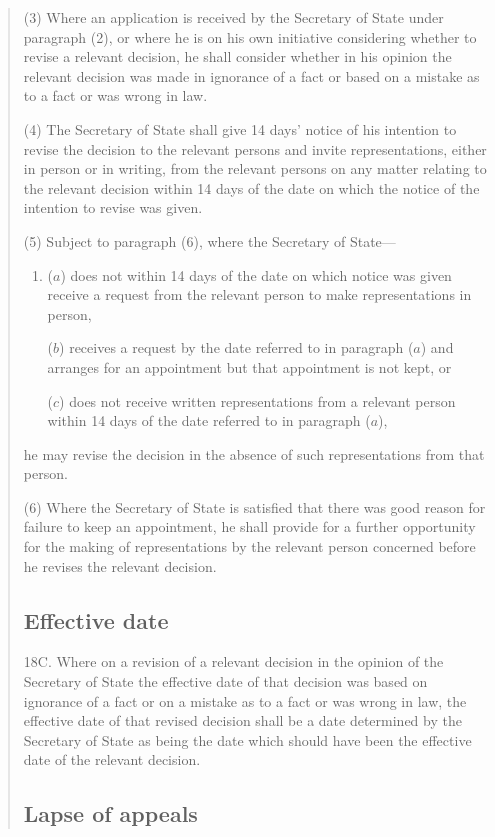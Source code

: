 \documentclass[12pt,a4paper]{article}
\begin{document}
\begin{quotation}
(3) Where an application is received by the Secretary of State under paragraph (2), or where he is on his own initiative considering whether to revise a relevant decision, he shall consider whether in his opinion the relevant decision was made in ignorance of a fact or based on a mistake as to a fact or was wrong in law.

(4) The Secretary of State shall give 14 days' notice of his intention to revise the decision to the relevant persons and invite representations, either in person or in writing, from the relevant persons on any matter relating to the relevant decision within 14 days of the date on which the notice of the intention to revise was given.

(5) Subject to paragraph (6), where the Secretary of State—
\begin{enumerate}\item[]
($a$) does not within 14 days of the date on which notice was given receive a request from the relevant person to make representations in person,

($b$) receives a request by the date referred to in paragraph ($a$) and arranges for an appointment but that appointment is not kept, or

($c$) does not receive written representations from a relevant person within 14 days of the date referred to in paragraph ($a$),
\end{enumerate}
he may revise the decision in the absence of such representations from that person.

(6) Where the Secretary of State is satisfied that there was good reason for failure to keep an appointment, he shall provide for a further opportunity for the making of representations by the relevant person concerned before he revises the relevant decision.

\subsection*{Effective date}

18C.  Where on a revision of a relevant decision in the opinion of the Secretary of State the effective date of that decision was based on ignorance of a fact or on a mistake as to a fact or was wrong in law, the effective date of that revised decision shall be a date determined by the Secretary of State as being the date which should have been the effective date of the relevant decision.

\subsection*{Lapse of appeals}


\end{quotation}
\end{document}
